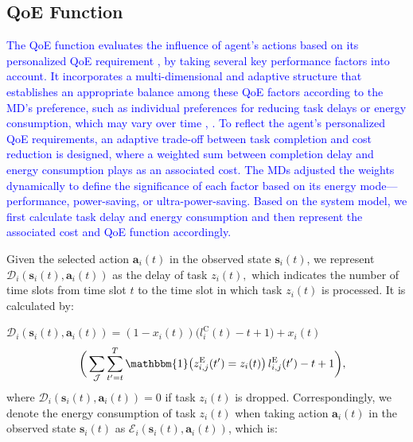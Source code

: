 \documentclass[10pt, journal,letterpaper]{IEEEtran}
\begin{document}
\subsection{QoE Function}
\textcolor{blue}{The QoE function evaluates the influence of agent's actions based on its personalized QoE requirement \cite{wang2017qoe}, by taking several key performance factors into account. It incorporates a multi-dimensional and adaptive structure that establishes an appropriate balance among these QoE factors according to the MD's preference, such as individual preferences for reducing task delays or energy consumption, which may vary over time \cite{wang2019intelligent}, \cite{mehrabi2019energy}. To reflect the agent’s personalized QoE requirements, an adaptive trade-off between task completion and cost reduction is designed, where a weighted sum between completion delay and energy consumption plays as an associated cost. The MDs adjusted the weights dynamically to define the significance of each factor based on its energy mode—performance, power-saving, or ultra-power-saving. 
	Based on the system model, we first calculate task delay and energy consumption and then represent the associated cost and QoE function accordingly.}
	
 Given the selected action $\boldsymbol{a}_i(t)$ in the observed state $\boldsymbol{s}_i(t)$, we represent $\mathcal{D}_i(\boldsymbol{s}_i(t), \boldsymbol{a}_i(t))$ as the delay of task $z_i(t),$ which indicates the number of time slots from time slot $t$ to the time slot in which task $z_i(t)$ is processed. It is calculated by: \vspace{2mm}

$\mathcal{D}_i(\boldsymbol{s}_i(t),\boldsymbol{a}_i(t)) = (1-x_i(t))\Big(l_i^{\text{C}}(t) - t + 1\Big)  +  x_i(t)$
\begin{alignat}{1}
	\;\;\;\,\bigg( \sum\limits_{\mathcal{J}} \sum\limits_{t'=t}^{T} \mathbbm{1}\big(z_{i,j}^{\text{E}}(t') = z_i(t)\big)\, l_{i,j}^{\text{E}}(t') - t +1\bigg),
	\label{21}  
\end{alignat} 
where $\mathcal{D}_i(\boldsymbol{s}_i(t),\boldsymbol{a}_i(t))= 0$ if task $z_i(t)$ is dropped. Correspondingly, we denote the energy consumption of task $z_i(t)$ when taking action $\boldsymbol{a}_i(t)$ in the observed state $\boldsymbol{s}_i(t)$ as $\mathcal{E}_i(\boldsymbol{s}_i(t),\boldsymbol{a}_i(t))$, which is: \vspace{1.7mm}
\end{document}
